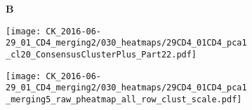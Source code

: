 \documentclass[a4paper, 12pt]{article}
\begin{document}
\clearpage

\begin{figure}[!thb]
\centering

    \caption{Data 29\_01 CD4, merging5 - 5 clusters}
    \begin{subfigure}[t]{0.02\textwidth}
    \vskip 0pt
        \textbf{\textsf{\normalsize B}}
    \end{subfigure}
    \begin{subfigure}[t]{0.45\textwidth}
    \vskip 0pt
    \caption{}
        \texttt{[image: CK\_2016-06-29\_01\_CD4\_merging2/030\_heatmaps/29CD4\_01CD4\_pca1\_cl20\_ConsensusClusterPlus\_Part22.pdf]}
    \end{subfigure}
    
\end{figure}


\begin{figure}[!thb]
\centering

    \caption{}
    \begin{subfigure}[t]{0.02\textwidth}
    \vskip 0pt
        \textbf{\textsf{\normalsize }}
    \end{subfigure}
    \begin{subfigure}[t]{0.9\textwidth}
    \vskip 0pt
    \caption{}
        \texttt{[image: CK\_2016-06-29\_01\_CD4\_merging2/030\_heatmaps/29CD4\_01CD4\_pca1\_merging5\_raw\_pheatmap\_all\_row\_clust\_scale.pdf]}
    \end{subfigure}
    

\end{figure}
\end{document}
